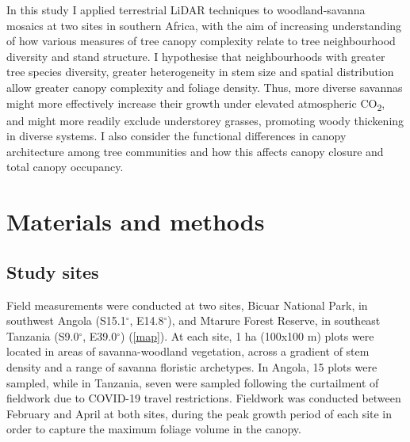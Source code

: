 \documentclass[11pt,a4paper]{article}
\begin{document}
In this study I applied terrestrial LiDAR techniques to woodland-savanna mosaics at two sites in southern Africa, with the aim of increasing understanding of how various measures of tree canopy complexity relate to tree neighbourhood diversity and stand structure. I hypothesise that neighbourhoods with greater tree species diversity, greater heterogeneity in stem size and spatial distribution allow greater canopy complexity and foliage density. Thus, more diverse savannas might more effectively increase their growth under elevated atmospheric CO\textsubscript{2}, and might more readily exclude understorey grasses, promoting woody thickening in diverse systems. I also consider the functional differences in canopy architecture among tree communities and how this affects canopy closure and total canopy occupancy.

\section{Materials and methods}

\subsection{Study sites}

Field measurements were conducted at two sites, Bicuar National Park, in southwest Angola (S15.1$^\circ$, E14.8$^\circ$), and Mtarure Forest Reserve, in southeast Tanzania (S9.0$^\circ$, E39.0$^\circ$) (\autoref{map}). At each site, 1 ha (100x100 m) plots were located in areas of savanna-woodland vegetation, across a gradient of stem density and a range of savanna floristic archetypes. In Angola, 15 plots were sampled, while in Tanzania, seven were sampled following the curtailment of fieldwork due to COVID-19 travel restrictions. Fieldwork was conducted between February and April at both sites, during the peak growth period of each site in order to capture the maximum foliage volume in the canopy.
\end{document}
